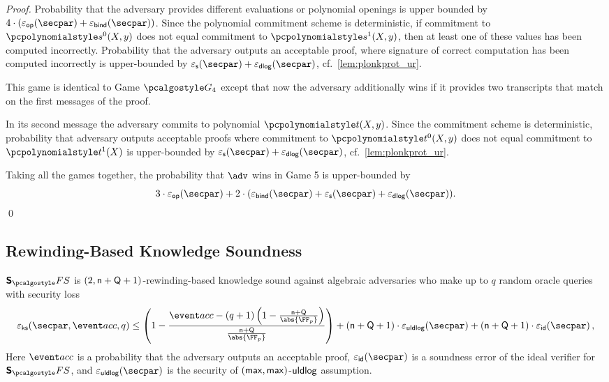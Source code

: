 \begin{proof}
  Probability that the adversary provides different evaluations or polynomial openings is
  upper bounded by $4 \cdot (\epsop (\secpar) + \epsbind (\secpar))$. Since the polynomial
  commitment scheme is deterministic, if commitment to $\p{s^0} (X, y)$ does not equal
  commitment to $\p{s^1} (X, y)$, then at least one of these values has been computed
  incorrectly. Probability that the adversary outputs an acceptable proof, where signature
  of correct computation has been computed incorrectly is upper-bounded by $\epss
  (\secpar) + \epsdlog (\secpar)$, cf.~\cref{lem:plonkprot_ur}.

    This game is identical to Game $\game{4}$ except that now the
  adversary additionally wins if it provides two transcripts that match on the
  first messages of the proof.

   In its second message the adversary commits to polynomial
  $\p{t} (X, y)$. Since the commitment scheme is deterministic, probability that adversary
  outputs acceptable proofs where commitment to $\p{t^0} (X, y)$ does not equal commitment
  to $\p{t^1} (X)$ is upper-bounded by $\epss (\secpar) + \epsdlog (\secpar)$, cf.~\cref{lem:plonkprot_ur}.

   Taking all the games together, the probability that $\adv$ wins
  in Game 5 is upper-bounded by
  \[
    3 \cdot \epsop (\secpar) + 2 \cdot (\epsbind (\secpar) + \epss (\secpar) +
    \epsdlog (\secpar)).
  \]
  \fi
  \qed
\end{proof}

\subsection{Rewinding-Based Knowledge Soundness}
\begin{lemma}
	\label{lem:sonicprot_ss}
  $\sonicprotfs$ is $(2, \mathsf{n} + \mathsf{Q} + 1)$-rewinding-based knowledge sound against algebraic adversaries who make up to $q$ random oracle queries with security loss 
  \[
    \epscss(\secpar,\accProb, q) \leq \left(1 - \frac{\accProb - (q + 1) \left(1 - \frac{\multconstr + \linconstr}{\abs{\FF_p}}\right)}{\frac{\multconstr + \linconstr}{\abs{\FF_p}}}\right) + (\multconstr + \linconstr + 1) \cdot \epsuldlog (\secpar) + (\multconstr + \linconstr + 1) \cdot \epsid (\secpar)\,,
  \]
	Here $\accProb$ is a probability that the adversary outputs an acceptable proof, $\epsid(\secpar)$ is a soundness error of the ideal verifier for $\sonicprotfs$, and $\epsuldlog(\secpar)$ is the security of $(\mathsf{max}, \mathsf{max})$-$\mathsf{uldlog}$ assumption.
\end{lemma}

